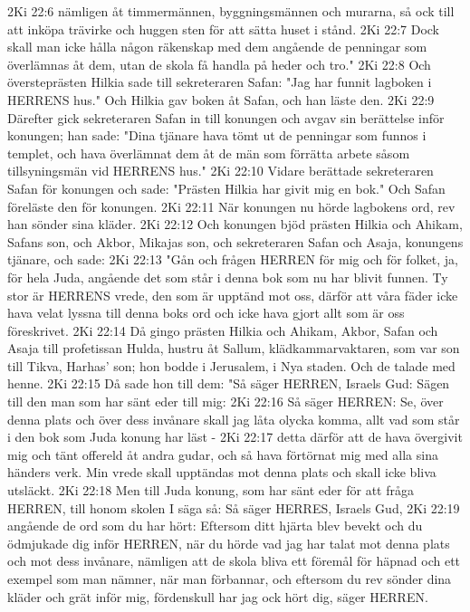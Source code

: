 2Ki 22:6  nämligen åt timmermännen, byggningsmännen och murarna, så ock till att inköpa trävirke och huggen sten för att sätta huset i stånd.
2Ki 22:7  Dock skall man icke hålla någon räkenskap med dem angående de penningar som överlämnas åt dem, utan de skola få handla på heder och tro."
2Ki 22:8  Och översteprästen Hilkia sade till sekreteraren Safan: "Jag har funnit lagboken i HERRENS hus." Och Hilkia gav boken åt Safan, och han läste den.
2Ki 22:9  Därefter gick sekreteraren Safan in till konungen och avgav sin berättelse inför konungen; han sade: "Dina tjänare hava tömt ut de penningar som funnos i templet, och hava överlämnat dem åt de män som förrätta arbete såsom tillsyningsmän vid HERRENS hus."
2Ki 22:10  Vidare berättade sekreteraren Safan för konungen och sade: "Prästen Hilkia har givit mig en bok." Och Safan föreläste den för konungen.
2Ki 22:11  När konungen nu hörde lagbokens ord, rev han sönder sina kläder.
2Ki 22:12  Och konungen bjöd prästen Hilkia och Ahikam, Safans son, och Akbor, Mikajas son, och sekreteraren Safan och Asaja, konungens tjänare, och sade:
2Ki 22:13  "Gån och frågen HERREN för mig och för folket, ja, för hela Juda, angående det som står i denna bok som nu har blivit funnen. Ty stor är HERRENS vrede, den som är upptänd mot oss, därför att våra fäder icke hava velat lyssna till denna boks ord och icke hava gjort allt som är oss föreskrivet.
2Ki 22:14  Då gingo prästen Hilkia och Ahikam, Akbor, Safan och Asaja till profetissan Hulda, hustru åt Sallum, klädkammarvaktaren, som var son till Tikva, Harhas' son; hon bodde i Jerusalem, i Nya staden. Och de talade med henne.
2Ki 22:15  Då sade hon till dem: "Så säger HERREN, Israels Gud: Sägen till den man som har sänt eder till mig:
2Ki 22:16  Så säger HERREN: Se, över denna plats och över dess invånare skall jag låta olycka komma, allt vad som står i den bok som Juda konung har läst -
2Ki 22:17  detta därför att de hava övergivit mig och tänt offereld åt andra gudar, och så hava förtörnat mig med alla sina händers verk. Min vrede skall upptändas mot denna plats och skall icke bliva utsläckt.
2Ki 22:18  Men till Juda konung, som har sänt eder för att fråga HERREN, till honom skolen I säga så: Så säger HERRES, Israels Gud,
2Ki 22:19  angående de ord som du har hört: Eftersom ditt hjärta blev bevekt och du ödmjukade dig inför HERREN, när du hörde vad jag har talat mot denna plats och mot dess invånare, nämligen att de skola bliva ett föremål för häpnad och ett exempel som man nämner, när man förbannar, och eftersom du rev sönder dina kläder och grät inför mig, fördenskull har jag ock hört dig, säger HERREN.
